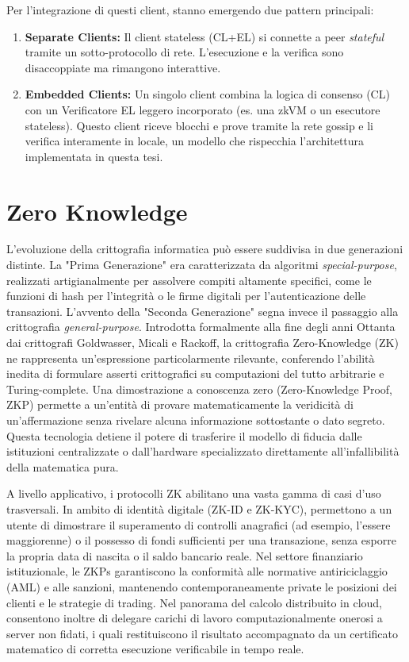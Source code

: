 \documentclass[12pt,a4paper,openright,twoside]{report}
\begin{document}
Per l'integrazione di questi client, stanno emergendo due pattern principali:
\begin{enumerate}
    \item \textbf{Separate Clients:} Il client stateless (CL+EL) si connette a peer \textit{stateful} tramite un sotto-protocollo di rete. L'esecuzione e la verifica sono disaccoppiate ma rimangono interattive.
    \item \textbf{Embedded Clients:} Un singolo client combina la logica di consenso (CL) con un Verificatore EL leggero incorporato (es. una zkVM o un esecutore stateless). Questo client riceve blocchi e prove tramite la rete gossip e li verifica interamente in locale, un modello che rispecchia l'architettura implementata in questa tesi.
\end{enumerate}

\section{Zero Knowledge}

L'evoluzione della crittografia informatica può essere suddivisa in due generazioni distinte. La "Prima Generazione" era caratterizzata da algoritmi \textit{special-purpose}, realizzati artigianalmente per assolvere compiti altamente specifici, come le funzioni di hash per l'integrità o le firme digitali per l'autenticazione delle transazioni. L'avvento della "Seconda Generazione" segna invece il passaggio alla crittografia \textit{general-purpose}. Introdotta formalmente alla fine degli anni Ottanta dai crittografi Goldwasser, Micali e Rackoff, la crittografia Zero-Knowledge\cite{zero-knowledge} (ZK) ne rappresenta un'espressione particolarmente rilevante, conferendo l'abilità inedita di formulare asserti crittografici su computazioni del tutto arbitrarie e Turing-complete. Una dimostrazione a conoscenza zero (Zero-Knowledge Proof, ZKP) permette a un'entità di provare matematicamente la veridicità di un'affermazione senza rivelare alcuna informazione sottostante o dato segreto. Questa tecnologia detiene il potere di trasferire il modello di fiducia dalle istituzioni centralizzate o dall'hardware specializzato direttamente all'infallibilità della matematica pura. 

A livello applicativo, i protocolli ZK abilitano una vasta gamma di casi d'uso trasversali. In ambito di identità digitale (ZK-ID e ZK-KYC), permettono a un utente di dimostrare il superamento di controlli anagrafici (ad esempio, l'essere maggiorenne) o il possesso di fondi sufficienti per una transazione, senza esporre la propria data di nascita o il saldo bancario reale. Nel settore finanziario istituzionale, le ZKPs garantiscono la conformità alle normative antiriciclaggio (AML) e alle sanzioni, mantenendo contemporaneamente private le posizioni dei clienti e le strategie di trading. Nel panorama del calcolo distribuito in cloud, consentono inoltre di delegare carichi di lavoro computazionalmente onerosi a server non fidati, i quali restituiscono il risultato accompagnato da un certificato matematico di corretta esecuzione verificabile in tempo reale.  
\end{document}
